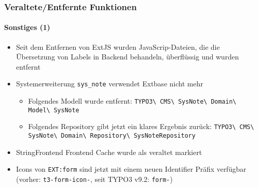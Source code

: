 
\begin{frame}[fragile]
	\frametitle{Veraltete/Entfernte Funktionen}
	\framesubtitle{Sonstiges (1)}

	\begin{itemize}
		\item Seit dem Entfernen von ExtJS wurden JavaScrip-Dateien, die die Übersetzung von Labels
			in Backend behandeln, überflüssig und wurden entfernt
		\item Systemerweiterung \texttt{sys\_note} verwendet Extbase nicht mehr

			\begin{itemize}
				\item Folgendes Modell wurde entfernt:
					\texttt{TYPO3\textbackslash
					CMS\textbackslash
						SysNote\textbackslash
						Domain\textbackslash
						Model\textbackslash
						SysNote}

				\item Folgendes Repository gibt jetzt ein klares Ergebnis zurück:
					\texttt{TYPO3\textbackslash
						CMS\textbackslash
						SysNote\textbackslash
						Domain\textbackslash
						Repository\textbackslash
						SysNoteRepository}

			\end{itemize}

		\item StringFrontend Frontend Cache wurde als veraltet markiert

		\item Icons von \texttt{EXT:form} sind jetzt mit einem neuen Identifier Präfix verfügbar\newline
			\small
				(vorher: \texttt{t3-form-icon-}, seit TYPO3 v9.2: \texttt{form-})
			\normalsize

	\end{itemize}

\end{frame}


